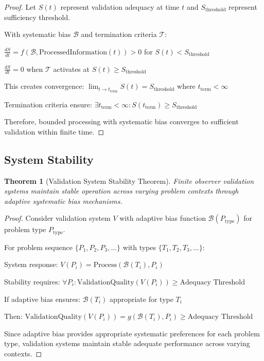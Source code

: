 \documentclass[12pt,a4paper]{article}
\newtheorem{theorem}{Theorem}
\begin{document}
\begin{proof}
Let $S(t)$ represent validation adequacy at time $t$ and $S_{\text{threshold}}$ represent sufficiency threshold.

With systematic bias $\mathcal{B}$ and termination criteria $\mathcal{T}$:

$\frac{dS}{dt} = f(\mathcal{B}, \text{ProcessedInformation}(t)) > 0$ for $S(t) < S_{\text{threshold}}$

$\frac{dS}{dt} = 0$ when $\mathcal{T}$ activates at $S(t) \geq S_{\text{threshold}}$

This creates convergence: $\lim_{t \to t_{\text{term}}} S(t) = S_{\text{threshold}}$ where $t_{\text{term}} < \infty$

Termination criteria ensure: $\exists t_{\text{term}} < \infty : S(t_{\text{term}}) \geq S_{\text{threshold}}$

Therefore, bounded processing with systematic bias converges to sufficient validation within finite time.
\end{proof}

\subsection{System Stability}

\begin{theorem}[Validation System Stability Theorem]
Finite observer validation systems maintain stable operation across varying problem contexts through adaptive systematic bias mechanisms.
\end{theorem}

\begin{proof}
Consider validation system $V$ with adaptive bias function $\mathcal{B}(P_{\text{type}})$ for problem type $P_{\text{type}}$.

For problem sequence $\{P_1, P_2, P_3, ...\}$ with types $\{T_1, T_2, T_3, ...\}$:

System response: $V(P_i) = \text{Process}(\mathcal{B}(T_i), P_i)$

Stability requires: $\forall P_i : \text{ValidationQuality}(V(P_i)) \geq \text{Adequacy Threshold}$

If adaptive bias ensures: $\mathcal{B}(T_i)$ appropriate for type $T_i$

Then: $\text{ValidationQuality}(V(P_i)) = g(\mathcal{B}(T_i), P_i) \geq \text{Adequacy Threshold}$

Since adaptive bias provides appropriate systematic preferences for each problem type, validation systems maintain stable adequate performance across varying contexts.
\end{proof}
\end{document}
